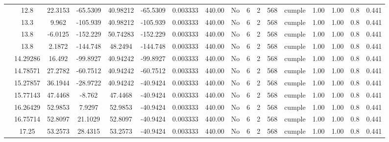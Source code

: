 \begin{table}[H]
{\begin{tabular}{|c|c|c|c|c|c|c|c|c|c|c|c|c|c|c|c|c|}
\cline{2-17}    & 12.8 & 22.3153 & -65.5309 & 40.98212 & -65.5309 & 0.003333 & 440.00 & No  & 6   & 2   & 568 & \cellcolor[rgb]{ .776,  .937,  .808}cumple & 1.00 & 1.00 & 0.8 & 0.441 \bigstrut\\
\cline{2-17}    & 13.3 & 9.962 & -105.939 & 40.98212 & -105.939 & 0.003333 & 440.00 & No  & 6   & 2   & 568 & \cellcolor[rgb]{ .776,  .937,  .808}cumple & 1.00 & 1.00 & 0.8 & 0.441 \bigstrut\\
\cline{2-17}    & \cellcolor[rgb]{ .851,  .882,  .949}13.8 & -6.0125 & -152.229 & 50.74283 & -152.229 & 0.003333 & 440.00 & No  & 6   & 2   & 568 & \cellcolor[rgb]{ .776,  .937,  .808}cumple & 1.00 & 1.00 & 0.8 & 0.441 \bigstrut\\
\cline{2-17}    & \cellcolor[rgb]{ .851,  .882,  .949}13.8 & 2.1872 & -144.748 & 48.2494 & -144.748 & 0.003333 & 440.00 & No  & 6   & 2   & 568 & \cellcolor[rgb]{ .776,  .937,  .808}cumple & 1.00 & 1.00 & 0.8 & 0.441 \bigstrut\\
\cline{2-17}    & 14.29286 & 16.492 & -99.8927 & 40.94242 & -99.8927 & 0.003333 & 440.00 & No  & 6   & 2   & 568 & \cellcolor[rgb]{ .776,  .937,  .808}cumple & 1.00 & 1.00 & 0.8 & 0.441 \bigstrut\\
\cline{2-17}    & 14.78571 & 27.2782 & -60.7512 & 40.94242 & -60.7512 & 0.003333 & 440.00 & No  & 6   & 2   & 568 & \cellcolor[rgb]{ .776,  .937,  .808}cumple & 1.00 & 1.00 & 0.8 & 0.441 \bigstrut\\
\cline{2-17}    & 15.27857 & 36.1944 & -28.9722 & 40.94242 & -40.9424 & 0.003333 & 440.00 & No  & 6   & 2   & 568 & \cellcolor[rgb]{ .776,  .937,  .808}cumple & 1.00 & 1.00 & 0.8 & 0.441 \bigstrut\\
\cline{2-17}    & 15.77143 & 47.4468 & -8.762 & 47.4468 & -40.9424 & 0.003333 & 440.00 & No  & 6   & 2   & 568 & \cellcolor[rgb]{ .776,  .937,  .808}cumple & 1.00 & 1.00 & 0.8 & 0.441 \bigstrut\\
\cline{2-17}    & 16.26429 & 52.9853 & 7.9297 & 52.9853 & -40.9424 & 0.003333 & 440.00 & No  & 6   & 2   & 568 & \cellcolor[rgb]{ .776,  .937,  .808}cumple & 1.00 & 1.00 & 0.8 & 0.441 \bigstrut\\
\cline{2-17}    & 16.75714 & 52.8097 & 21.1029 & 52.8097 & -40.9424 & 0.003333 & 440.00 & No  & 6   & 2   & 568 & \cellcolor[rgb]{ .776,  .937,  .808}cumple & 1.00 & 1.00 & 0.8 & 0.441 \bigstrut\\
\cline{2-17}    & 17.25 & 53.2573 & 28.4315 & 53.2573 & -40.9424 & 0.003333 & 440.00 & No  & 6   & 2   & 568 & \cellcolor[rgb]{ .776,  .937,  .808}cumple & 1.00 & 1.00 & 0.8 & 0.441 \bigstrut\\

\end{tabular}}
\end{table}
